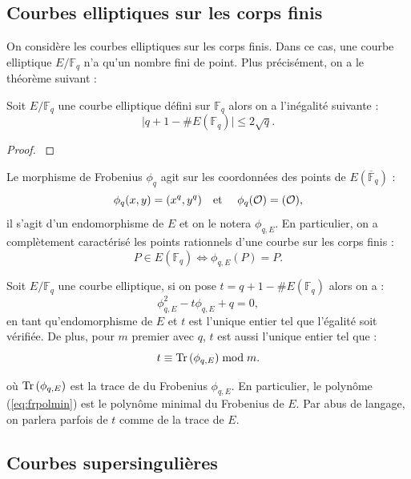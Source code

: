 \documentclass[a4paper]{article} %
\numberwithin{section}{part}
\numberwithin{equation}{section}
\newcommand\GF[1]{\mathbb{F}_{#1}}
\newcommand\Tr[1]{\textup{Tr}\left(#1\right)}
\newcommand\EO{\mathcal{O}}
\newcommand\etmath{\textup{\quad et \quad}}
\begin{document}
\subsection{Courbes elliptiques sur les corps finis}
On considère les courbes elliptiques sur les corps finis. Dans ce cas, une 
courbe elliptique $E/\GF{q}$ n'a qu'un nombre fini de point. Plus
précisément, on a le théorème suivant :
\begin{thm}[Hasse]
\label{th:hasse}
Soit $E/\GF{q}$ une courbe elliptique défini sur $\GF{q}$ alors on a l'inégalité
suivante :
\begin{equation}
\vert{q + 1 - \#E(\GF{q})}\vert\leq 2\sqrt{q}.
\end{equation}
\end{thm}
\begin{proof}
\cite[Chap. V, th. 1.1]{Sil}
\end{proof}
Le morphisme de Frobenius $\phi_q$ agit sur les coordonnées des points de
$E(\overline{\mathbb{F}}_q)$ :
\begin{equation}
\phi_q(x,y) = (x^q, y^q)\etmath \phi_q(\EO) = (\EO),
\end{equation}
il s'agit d'un endomorphisme de $E$ et on le notera $\phi_{q,E}$. 
En particulier, on a complètement caractérisé les points rationnels d'une courbe
sur les corps finis :
\begin{equation}
P\in E(\GF{q}) \Leftrightarrow \phi_{q,E}(P) = P.
\end{equation}
\begin{prop}
Soit $E/\GF{q}$ une courbe elliptique, si on pose $t = q + 1 - \#E(\GF{q})$
alors on a :
\begin{equation}
\label{eq:frpolmin}
\phi_{q,E}^2 - t\phi_{q,E} + q = 0,
\end{equation}
en tant qu'endomorphisme de $E$ et $t$ est l'unique entier tel que l'égalité
soit vérifiée. De plus, pour $m$ premier avec $q$, $t$ est aussi l'unique entier
tel que :
\begin{equation}
t \equiv \Tr{\phi_{q,E}} \bmod m.
\end{equation}
\end{prop}
où $\Tr{\phi_{q,E}}$ est la trace de du Frobenius $\phi_{q,E}$. En particulier, 
le polynôme (\ref{eq:frpolmin}) est le polynôme minimal du
Frobenius de $E$. Par abus de langage, on parlera parfois de $t$ comme de la 
trace de $E$.

\subsection{Courbes supersingulières}
\label{sec:singcurve}
\vspace{0.3cm}
\end{document}
